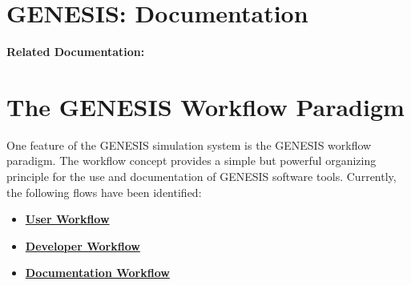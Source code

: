 \documentclass[12pt]{article}
\begin{document}
\section*{GENESIS: Documentation}

{\bf Related Documentation:}

\section*{The GENESIS Workflow Paradigm}

One feature of the GENESIS simulation system is the GENESIS workflow paradigm. The workflow concept provides a simple but powerful organizing principle for the use and documentation of GENESIS software tools. Currently, the following flows have been identified:

\begin{itemize}
\item \href {../workflow-user/workflow-user.tex}{\bf User Workflow}
\item \href{../workflow-developer/workflow-developer.tex}{\bf Developer Workflow}
\item \href{\bf ../workflow-documentation/workflow-documentation.tex}{\bf Documentation Workflow}
\end{itemize}
\end{document}
